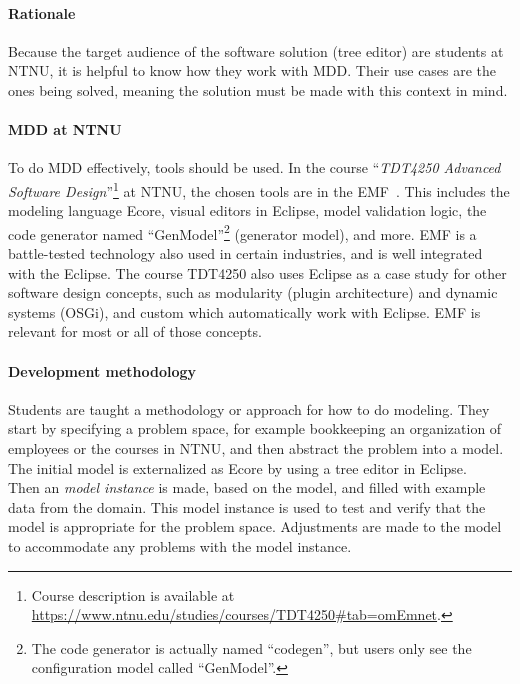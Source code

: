 \paragraph{Rationale}
Because the target audience of the software solution (tree editor) are students at \acrshort{NTNU}, it is helpful to know how they work with \acrlong{MDD}.
Their use cases are the ones being solved, meaning the solution must be made with this context in mind.

\paragraph{\Acrshort{MDD} at \acrshort{NTNU}}
To do \acrlong{MDD} effectively, tools should be used.
In the course ``\textit{\gls{TDT4250} Advanced Software Design}''\footnote{Course description is available at \href{https://www.ntnu.edu/studies/courses/TDT4250\#tab=omEmnet}{https://www.ntnu.edu/studies/courses/TDT4250\#tab=omEmnet}.} at \acrshort{NTNU}, the chosen tools are in the \acrfull{EMF}~\cite{hallvardtraettebergEMFTDT4250NTNU2017}.
This includes the modeling language \gls{Ecore}, visual editors in \gls{Eclipse}, model validation logic, the code generator named ``GenModel''\footnote{The code generator is actually named ``codegen'', but users only see the configuration model called ``GenModel''.} (generator model), and more.
\Acrshort{EMF} is a battle-tested technology also used in certain industries, and is well integrated with the \gls{Eclipse}.
The course \gls{TDT4250} also uses \gls{Eclipse} as a case study for other software design concepts, such as modularity (plugin architecture) and dynamic systems (OSGi), and custom  which automatically work with \gls{Eclipse}.
\Acrshort{EMF} is relevant for most or all of those concepts.

\paragraph{Development methodology}\label{par:tdt4250-methodology}
Students are taught a methodology or approach for how to do modeling.
They start by specifying a problem space, for example bookkeeping an organization of employees or the courses in \acrshort{NTNU}, and then abstract the problem into a model.
The initial model is externalized as \gls{Ecore} by using a tree editor in \gls{Eclipse}.\\

Then an \textit{model instance} is made, based on the model, and filled with example data from the domain.
This model instance is used to test and verify that the model is appropriate for the problem space.
Adjustments are made to the model to accommodate any problems with the model instance.\\

